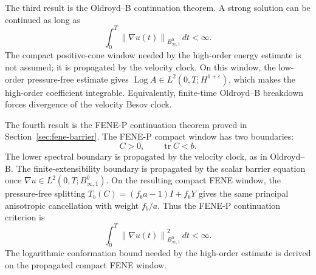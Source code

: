\documentclass[11pt]{article}
\newcommand{\tr}{\operatorname{tr}}
\newcommand{\Log}{\operatorname{Log}}
\newcommand{\eps}{\varepsilon}
\newcommand{\norm}[1]{\left\lVert #1\right\rVert}
\newcommand{\Besov}{B^0_{\infty,1}}
\begin{document}
The third result is the Oldroyd--B continuation theorem.  A strong solution can
be continued as long as
\[
  \int_0^T\norm{\nabla u(t)}_{\Besov}\,dt<\infty .
\]
The compact positive-cone window needed by the high-order energy estimate is
not assumed; it is propagated by the velocity clock.  On this window, the
low-order pressure-free estimate gives
\(\Log A\in L^2(0,T;H^{1+\eps})\), which makes the high-order coefficient
integrable.  Equivalently, finite-time Oldroyd--B breakdown forces divergence
of the velocity Besov clock.

The fourth result is the FENE-P continuation theorem proved in
Section~\ref{sec:fene-barrier}.  The FENE-P compact window has two
boundaries:
\[
  C>0,\qquad \tr C<b.
\]
The lower spectral boundary is propagated by the velocity clock, as in
Oldroyd--B.  The finite-extensibility boundary is propagated by the scalar
barrier equation once
\(\nabla u\in L^2(0,T;B^0_{\infty,1})\).  On the resulting compact FENE window,
the pressure-free splitting \(T_b(C)=(f_ba-1)I+f_bY\) gives the same principal
anisotropic cancellation with weight \(f_b/a\).  Thus the FENE-P continuation
criterion is
\[
  \int_0^T\norm{\nabla u(t)}_{\Besov}^2\,dt<\infty .
\]
The logarithmic conformation bound needed by the high-order estimate is
derived on the propagated compact FENE window.
\end{document}
